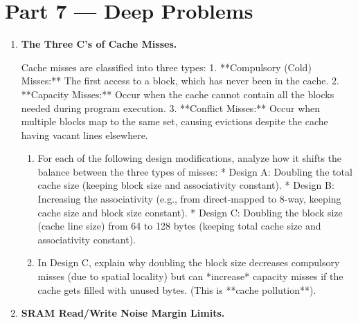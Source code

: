 \documentclass[12pt, a4paper]{book}
\begin{document}
\newpage

\section{Part 7 --- Deep Problems}

\begin{deepbox}
\begin{enumerate}[label=\textbf{D\arabic*.}]
  \item \textbf{The Three C's of Cache Misses.}
  
        Cache misses are classified into three types:
        1. **Compulsory (Cold) Misses:** The first access to a block, which has never been in the cache.
        2. **Capacity Misses:** Occur when the cache cannot contain all the blocks needed during program execution.
        3. **Conflict Misses:** Occur when multiple blocks map to the same set, causing evictions despite the cache having vacant lines elsewhere.
        
        \begin{enumerate}[label=(\alph*)]
          \item For each of the following design modifications, analyze how it shifts the balance between the three types of misses:
                * Design A: Doubling the total cache size (keeping block size and associativity constant).
                * Design B: Increasing the associativity (e.g., from direct-mapped to 8-way, keeping cache size and block size constant).
                * Design C: Doubling the block size (cache line size) from 64 to 128 bytes (keeping total cache size and associativity constant).
          \item In Design C, explain why doubling the block size decreases compulsory misses (due to spatial locality) but can *increase* capacity misses if the cache gets filled with unused bytes. (This is **cache pollution**).
        \end{enumerate}

  \item \textbf{SRAM Read/Write Noise Margin Limits.}
  

\end{enumerate}
\end{deepbox}
\end{document}
